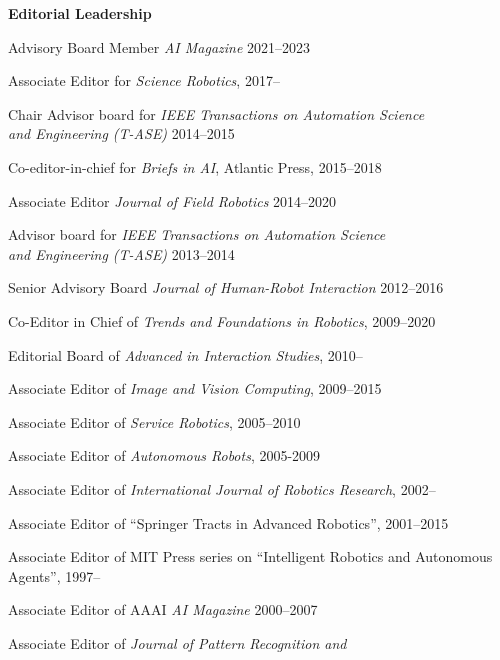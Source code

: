 \documentclass{article}
\begin{document}
\begin{cv}
\begin{cvlist} {\bf Editorial Leadership} 
  \item Advisory Board Member {\em AI Magazine} \cftdotfill{\cftdotsep} 2021--2023
  \item Associate Editor for {\em Science Robotics}, \cftdotfill{\cftdotsep} 2017--
  \item Chair Advisor board for {\em IEEE Transactions on Automation
    Science\\ and Engineering (T-ASE)}  \cftdotfill{\cftdotsep} 2014--2015
  \item Co-editor-in-chief for {\em Briefs in AI}, Atlantic Press,
    \cftdotfill{\cftdotsep}  2015--2018
  \item Associate Editor {\em Journal of Field Robotics}
    \cftdotfill{\cftdotsep} 2014--2020
  \item Advisor board for {\em IEEE Transactions on Automation
    Science\\ and Engineering (T-ASE)} \cftdotfill{\cftdotsep} 2013--2014
  \item Senior Advisory Board {\em Journal of Human-Robot Interaction}
    \cftdotfill{\cftdotsep} 2012--2016
  \item Co-Editor in Chief of {\em Trends and Foundations in
    Robotics}, \cftdotfill{\cftdotsep} 2009--2020
  \item Editorial Board of {\em Advanced in Interaction
    Studies},\cftdotfill{\cftdotsep} 2010--
  \item Associate Editor of {\em Image and Vision
    Computing},\cftdotfill{\cftdotsep} 2009--2015
  \item Associate Editor of {\em Service Robotics},
    \cftdotfill{\cftdotsep} 2005--2010
  \item Associate Editor of {\em Autonomous Robots},
    \cftdotfill{\cftdotsep} 2005-2009
  \item Associate Editor of {\em International Journal of Robotics
    Research},\cftdotfill{\cftdotsep} 2002--
  \item Associate Editor of ``Springer Tracts in Advanced
    Robotics'',\cftdotfill{\cftdotsep} 2001--2015
  \item Associate Editor of MIT Press series on ``Intelligent Robotics
    and Autonomous\\ Agents'',\cftdotfill{\cftdotsep} 1997--
  \item Associate Editor of AAAI {\em AI
    Magazine}\cftdotfill{\cftdotsep} 2000--2007
  \item Associate Editor of {\em Journal of Pattern Recognition and
}
\end{cvlist}
\end{cv}
\end{document}
